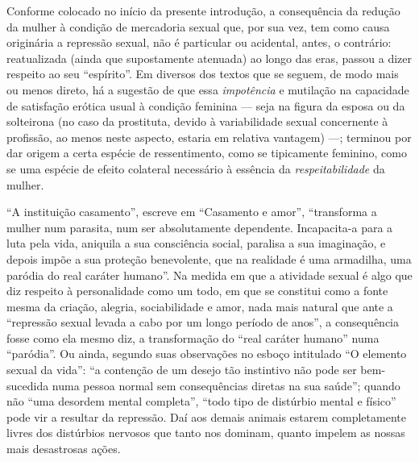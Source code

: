 Conforme colocado no início da presente introdução, a consequência da
redução da mulher à condição de mercadoria sexual que, por sua vez, tem
como causa originária a repressão sexual, não é particular ou acidental,
antes, o contrário: reatualizada (ainda que supostamente atenuada) ao
longo das eras, passou a dizer respeito ao seu ``espírito''. Em diversos
dos textos que se seguem, de modo mais ou menos direto, há a sugestão de
que essa \textit{impotência} e mutilação na capacidade de satisfação erótica
usual à condição feminina --- seja na figura da esposa ou da solteirona
(no caso da prostituta, devido à variabilidade sexual concernente à
profissão, ao menos neste aspecto, estaria em relativa vantagem) ---;
terminou por dar origem a certa espécie de ressentimento, como se
tipicamente feminino, como se uma espécie de efeito colateral necessário
à essência da \textit{respeitabilidade} da mulher. 

``A instituição
casamento'', escreve em ``Casamento e amor'', ``transforma a mulher num
parasita, num ser absolutamente dependente. Incapacita-a para a luta
pela vida, aniquila a sua consciência social, paralisa a sua imaginação,
e depois impõe a sua proteção benevolente, que na realidade é uma
armadilha, uma paródia do real caráter humano''. Na medida em que a
atividade sexual é algo que diz respeito à personalidade como um todo,
em que se constitui como a fonte mesma da criação, alegria,
sociabilidade e amor, nada mais natural que ante a ``repressão sexual
levada a cabo por um longo período de anos'', a consequência fosse como
ela mesmo diz, a transformação do ``real caráter humano'' numa
``paródia''. Ou ainda, segundo suas observações no esboço intitulado ``O
elemento sexual da vida'': ``a contenção de um desejo tão instintivo não
pode ser bem-sucedida numa pessoa normal sem consequências diretas na
sua saúde''; quando não ``uma desordem mental completa'', ``todo tipo de
distúrbio mental e físico'' pode vir a resultar da repressão. Daí aos
demais animais estarem completamente livres dos distúrbios nervosos que
tanto nos dominam, quanto impelem as nossas mais desastrosas ações.

